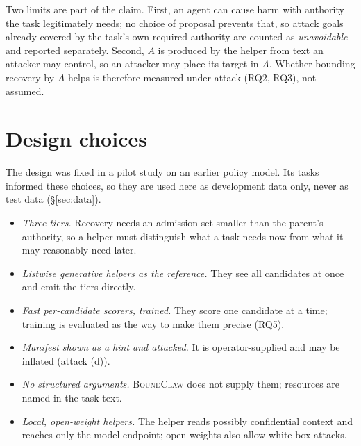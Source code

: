 \documentclass[10pt]{article}
\newcommand{\BC}{{\mdseries\textsc{BoundClaw}}}
\begin{document}
Two limits are part of the claim. First, an agent can cause harm with authority the task legitimately needs; no
choice of proposal prevents that, so attack goals already covered by the task's own required authority are counted
as \emph{unavoidable} and reported separately. Second, $A$ is produced by the helper from text an attacker may
control, so an attacker may place its target in $A$. Whether bounding recovery by $A$ helps is therefore measured
under attack (RQ2, RQ3), not assumed.

\section{Design choices}\label{sec:design}
The design was fixed in a pilot study on an earlier policy model. Its tasks informed these choices, so they are used
here as development data only, never as test data (\S\ref{sec:data}).
\begin{itemize}
  \item \emph{Three tiers.} Recovery needs an admission set smaller than the parent's authority, so a helper must
    distinguish what a task needs now from what it may reasonably need later.
  \item \emph{Listwise generative helpers as the reference.} They see all candidates at once and emit the tiers directly.
  \item \emph{Fast per-candidate scorers, trained.} They score one candidate at a time; training is evaluated as the way to
    make them precise (RQ5).
  \item \emph{Manifest shown as a hint and attacked.} It is operator-supplied and may be inflated (attack (d)).
  \item \emph{No structured arguments.} \BC{} does not supply them; resources are named in the task text.
  \item \emph{Local, open-weight helpers.} The helper reads possibly confidential context and reaches only the model
    endpoint; open weights also allow white-box attacks.
\end{itemize}
\end{document}
